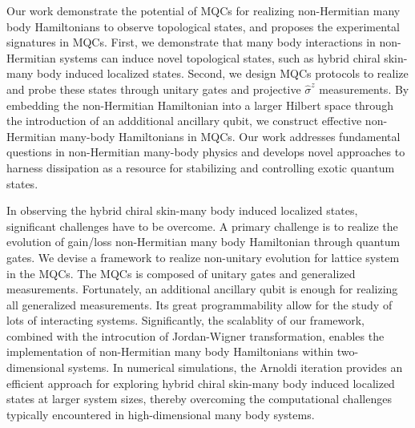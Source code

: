 \documentclass[longbibliography, aps, prx, amsmath, amssymb, amsfonts, twocolumn,superscriptaddress, footinbib]{revtex4-1}
\begin{document}
	Our work demonstrate the potential of MQCs for realizing non-Hermitian many body Hamiltonians to observe topological states, and proposes the experimental signatures in MQCs.
	First, we demonstrate that many body interactions in non-Hermitian systems can induce novel topological states, such as hybrid chiral skin-many body induced localized states.
	Second, we design MQCs protocols to realize and probe these states through unitary gates and projective $\hat{\sigma}^z$ measurements. 
	By embedding the non-Hermitian Hamiltonian into a larger Hilbert space through the introduction of an addditional ancillary qubit, we construct effective non-Hermitian many-body Hamiltonians in MQCs. 
	Our work addresses fundamental questions in non-Hermitian many-body physics and develops novel approaches to harness dissipation as a resource for stabilizing and controlling exotic quantum states.

	In observing the hybrid chiral skin-many body induced localized states, significant challenges have to be overcome. A primary challenge is to realize the evolution of gain/loss non-Hermitian many body Hamiltonian through quantum gates. 
	We devise a framework to realize non-unitary evolution for lattice system in the MQCs. The MQCs is composed of unitary gates and generalized measurements. Fortunately, an additional ancillary qubit is enough for realizing all generalized measurements. Its great programmability allow for the study of lots of interacting systems. 
	Significantly, the scalablity of our framework, combined with the introcution of Jordan-Wigner transformation, enables the implementation of non-Hermitian many body Hamiltonians within two-dimensional systems. 
	In numerical simulations, the Arnoldi iteration provides an efficient approach for exploring hybrid chiral skin-many body induced localized states at larger system sizes, thereby overcoming the computational challenges typically encountered in high-dimensional many body systems.
\end{document}
